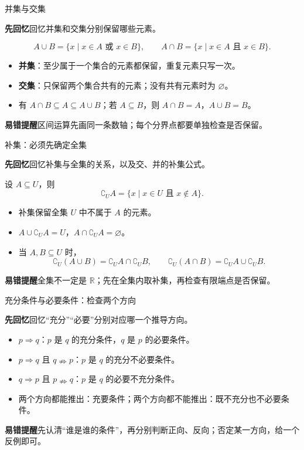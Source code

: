 \documentclass[UTF8,10pt,aspectratio=169,handout]{ctexbeamer}
\newcommand{\Recall}[1]{\par\noindent\textcolor{KnowledgeBlue}{\textbf{先回忆}\quad #1}\par\vspace{0.3cm}}
\newcommand{\Pitfall}[1]{\par\vspace{0.22cm}\noindent\textbf{易错提醒}\quad #1\par}
\begin{document}
\begin{frame}[t]{并集与交集}
\large
\Recall{回忆并集和交集分别保留哪些元素。}
\pause
\[
A\cup B=\{x\mid x\in A\text{ 或 }x\in B\},\qquad
A\cap B=\{x\mid x\in A\text{ 且 }x\in B\}.
\]
\begin{itemize}
  \item \textbf{并集}：至少属于一个集合的元素都保留，重复元素只写一次。
  \item \textbf{交集}：只保留两个集合共有的元素；没有共有元素时为 $\varnothing$。
  \item 有 $A\cap B\subseteq A\subseteq A\cup B$；若 $A\subseteq B$，则 $A\cap B=A$，$A\cup B=B$。
\end{itemize}
\Pitfall{区间运算先画同一条数轴；每个分界点都要单独检查是否保留。}
\end{frame}

\begin{frame}[t]{补集：必须先确定全集}
\large
\Recall{回忆补集与全集的关系，以及交、并的补集公式。}
\pause
设 $A\subseteq U$，则
\[\complement_U A=\{x\mid x\in U\text{ 且 }x\notin A\}.\]
\begin{itemize}
  \item 补集保留全集 $U$ 中不属于 $A$ 的元素。
  \item $A\cup\complement_U A=U$，$A\cap\complement_U A=\varnothing$。
  \item 当 $A,B\subseteq U$ 时，
  \[\complement_U(A\cup B)=\complement_U A\cap\complement_U B,\qquad
    \complement_U(A\cap B)=\complement_U A\cup\complement_U B.\]
\end{itemize}
\Pitfall{全集不一定是 $\mathbb R$；先在全集内取补集，再检查有限端点是否保留。}
\end{frame}

\begin{frame}[t]{充分条件与必要条件：检查两个方向}
\large
\Recall{回忆“充分”“必要”分别对应哪一个推导方向。}
\pause
\begin{itemize}
  \item $p\Rightarrow q$：$p$ 是 $q$ 的充分条件，$q$ 是 $p$ 的必要条件。
  \item $p\Rightarrow q$ 且 $q\nRightarrow p$：$p$ 是 $q$ 的充分不必要条件。
  \item $q\Rightarrow p$ 且 $p\nRightarrow q$：$p$ 是 $q$ 的必要不充分条件。
  \item 两个方向都能推出：充要条件；两个方向都不能推出：既不充分也不必要条件。
\end{itemize}
\Pitfall{先认清“谁是谁的条件”，再分别判断正向、反向；否定某一方向，给一个反例即可。}
\end{frame}
\end{document}

